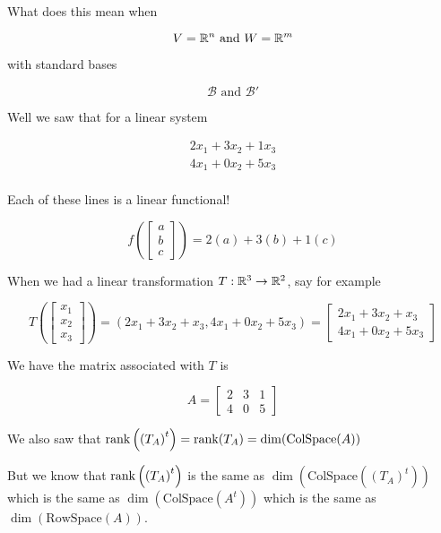 \documentclass[12pt]{article}
\def\RowSpace{\text{RowSpace}}
\def\ColSpace{\text{ColSpace}}
\def\B{\mathcal B}
\begin{document}
  What does this mean when

  \[
    V = {\mathbb R}^n \text{ and } W = {\mathbb R}^m
  \]

  with standard bases

  \[
    \B \text{ and } \B'
  \]

  Well we saw that for a linear system

  \begin{align*}
    2x_1 + 3x_2 + 1x_3 \\
    4x_1 + 0x_2 + 5x_3 \\
  \end{align*}

  Each of these lines is a linear functional!

  \[
    f\left(\begin{bmatrix} a \\ b \\ c \end{bmatrix}\right) = 2(a) + 3(b) + 1(c)
  \]

  When we had a linear transformation $T: {\mathbb R}^3 \to {\mathbb R}^2$, say for example

  \[
    T\left(\begin{bmatrix} x_1 \\ x_2 \\ x_3 \end{bmatrix}\right) = (2x_1 + 3x_2
    + x_3, 4x_1 + 0x_2 + 5x_3) = \begin{bmatrix}
      2x_1 + 3x_2 + x_3 \\
      4x_1 + 0x_2 + 5x_3
    \end{bmatrix}
  \]

  We have the matrix associated with $T$ is

  \[
    A = \begin{bmatrix}
      2 & 3 & 1 \\
      4 & 0 & 5
    \end{bmatrix}
  \]

  We also saw that $\rank\left(\left(T_A\right)^t\right) = \rank(T_A) =
  \dim(\ColSpace(A))$

  But we know that $\mathrm{rank}\left(\left(T_A\right)^t\right)$ is the same as
  $\dim(\ColSpace((T_A)^t))$ which is the same as $\dim(\ColSpace(A^t))$ which
  is the same as $\dim(\RowSpace(A))$.
\end{document}
